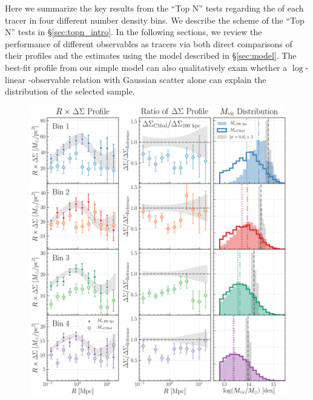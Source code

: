 \documentclass[a4paper,fleqn,usenatbib]{mnras}
\begin{document}
    Here we summarize the key results from the ``Top N'' tests regarding the \sighalo{} of
    each \mvir{} tracer in four different number density bins.
    We describe the scheme of the ``Top N'' tests in \S \ref{sec:topn_intro}.
    In the following sections, we review the performance of different observables as \mvir{}
    tracers via both direct comparisons of their \dsigma{} profiles and the \sighalo{}
    estimates using the model described in \S \ref{sec:model}.
    The best-fit \dsigma{} profile from our simple model can also qualitatively exam whether
    a $\log$-linear \mvir{}-observable relation with Gaussian scatter alone can explain the
    \mvir{} distribution of the selected sample.

  \begin{figure}
      \centering
      \includegraphics[width=\textwidth]{figure/topn_dsigma_m100_cmod_compare}
      \caption{
          }
      \label{fig:m100_cmod}
  \end{figure}
\end{document}

